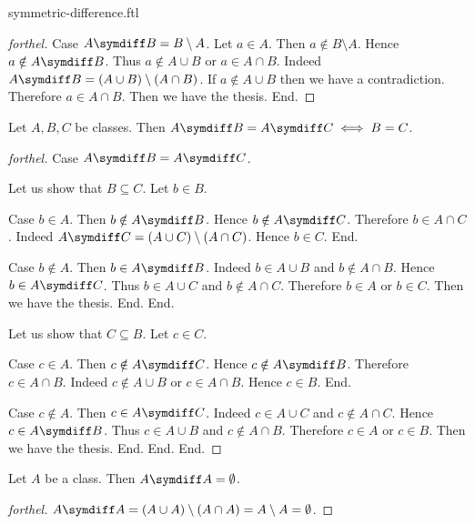 \documentclass{naproche-library}
\begin{document}
\begin{smodule}{symmetric-difference.ftl}
\begin{proof}[forthel]
    Case $A \symdiff B = B \setminus A$.
      Let $a \in A$.
      Then $a \notin B \setminus A$.
      Hence $a \notin A \symdiff B$.
      Thus $a \notin A \cup B$ or $a \in A \cap B$.
      Indeed $A \symdiff B = (A \cup B) \setminus (A \cap B)$.
      If $a \notin A \cup B$ then we have a contradiction.
      Therefore $a \in A \cap B$.
      Then we have the thesis.
    End.
  \end{proof}

  \begin{proposition}[forthel,id=FOUNDATIONS_03_4490230937681920,printid]
    Let $A, B, C$ be classes.
    Then $A \symdiff B = A \symdiff C \iff B = C$.
  \end{proposition}
  \begin{proof}[forthel]
    Case $A \symdiff B = A \symdiff C$.

      Let us show that $B \subseteq C$.
        Let $b \in B$.

        Case $b \in A$.
          Then $b \notin A \symdiff B$.
          Hence $b \notin A \symdiff C$.
          Therefore $b \in A \cap C$.
          Indeed $A \symdiff C = (A \cup C) \setminus (A \cap C)$.
          Hence $b \in C$.
        End.

        Case $b \notin A$.
          Then $b \in A \symdiff B$.
          Indeed $b \in A \cup B$ and $b \notin A \cap B$.
          Hence $b \in A \symdiff C$.
          Thus $b \in A \cup C$ and $b \notin A \cap C$.
          Therefore $b \in A$ or $b \in C$.
          Then we have the thesis.
        End.
      End.

      Let us show that $C \subseteq B$.
        Let $c \in C$.

        Case $c \in A$.
          Then $c \notin A \symdiff C$.
          Hence $c \notin A \symdiff B$.
          Therefore $c \in A \cap B$.
          Indeed $c \notin A \cup B$ or $c \in A \cap B$.
          Hence $c \in B$.
        End.

        Case $c \notin A$.
          Then $c \in A \symdiff C$.
          Indeed $c \in A \cup C$ and $c \notin A \cap C$.
          Hence $c \in A \symdiff B$.
          Thus $c \in A \cup B$ and $c \notin A \cap B$.
          Therefore $c \in A$ or $c \in B$.
          Then we have the thesis.
        End.
      End.
    End.
  \end{proof}

  \begin{proposition}[forthel,id=FOUNDATIONS_03_4578696040022016,printid]
    Let $A$ be a class.
    Then $A \symdiff A = \emptyset$.
  \end{proposition}
  \begin{proof}[forthel]
    $A \symdiff A
      = (A \cup A) \setminus (A \cap A)
      = A \setminus A
      = \emptyset$.
  \end{proof}


\end{smodule}
\end{document}

